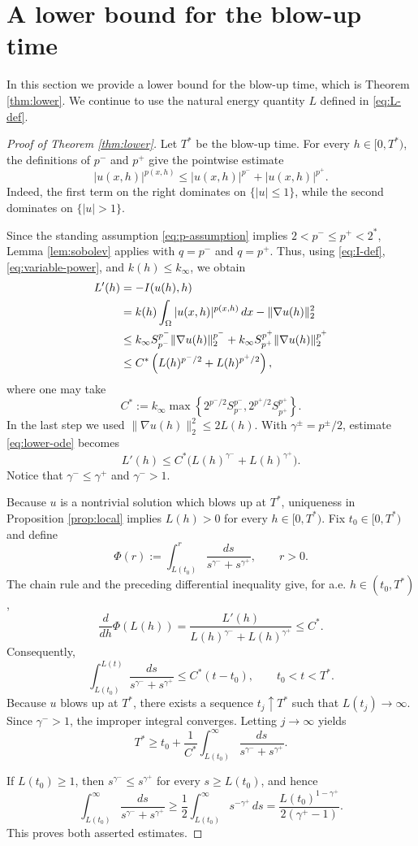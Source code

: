 \documentclass[12pt,reqno]{amsart}
\theoremstyle{definition}
\theoremstyle{remark}
\numberwithin{equation}{section}
\begin{document}
\section{A lower bound for the blow-up time} \label{sec:lower}


In this section we provide a lower bound for the blow-up time, which is Theorem \ref{thm:lower}.
We continue to use the natural energy quantity $L$ defined in \eqref{eq:L-def}.


\begin{proof}[Proof of Theorem \ref{thm:lower}]
Let $T^*$ be the blow-up time. For every $h\in[0,T^*)$, the definitions of $p^-$ and $p^+$ give the pointwise estimate
\begin{equation}\label{eq:variable-power}
|u(x,h)|^{p(x,h)}\le |u(x,h)|^{p^-}+|u(x,h)|^{p^+}.
\end{equation}
Indeed, the first term on the right dominates on $\{|u|\le1\}$, while the second dominates on $\{|u|>1\}$.

Since the standing assumption \eqref{eq:p-assumption} implies $2<p^-\le p^+<2^*$, Lemma \ref{lem:sobolev} applies with $q=p^-$ and $q=p^+$. Thus, using \eqref{eq:I-def}, \eqref{eq:variable-power}, and $k(h)\le k_\infty$, we obtain
\begin{align}
L'(h)
&=-I(u(h),h)\notag\\
&=k(h)\int_\Omega |u(x,h)|^{p(x,h)}\,dx
-\|\nabla u(h)\|_2^2\notag\\
&\le k_\infty S_{p^-}^{p^-}\|\nabla u(h)\|_2^{p^-}
+k_\infty S_{p^+}^{p^+}\|\nabla u(h)\|_2^{p^+}\notag\\
&\le C^*\left(L(h)^{p^-/2}+L(h)^{p^+/2}\right),
\label{eq:lower-ode}
\end{align}
where one may take
\[
C^*:=k_\infty\max\left\{
2^{p^-/2}S_{p^-}^{p^-},
2^{p^+/2}S_{p^+}^{p^+}
\right\}.
\]
In the last step we used $\|\nabla u(h)\|_2^2\le2L(h)$.
With $\gamma^\pm=p^\pm/2$, estimate \eqref{eq:lower-ode} becomes
\[
L'(h)\le C^*\bigl(L(h)^{\gamma^-}+L(h)^{\gamma^+}\bigr).
\]
Notice that $\gamma^-\le\gamma^+$ and $\gamma^->1$.

Because $u$ is a nontrivial solution which blows up at $T^*$, uniqueness in Proposition \ref{prop:local} implies $L(h)>0$ for every $h\in[0,T^*)$. Fix $t_0\in[0,T^*)$ and define
\[
\Phi(r):=\int_{L(t_0)}^r
\frac{ds}{s^{\gamma^-}+s^{\gamma^+}},
\qquad r>0.
\]
The chain rule and the preceding differential inequality give, for a.e. $h\in(t_0,T^*)$,
\[
\frac{d}{dh}\Phi(L(h))
=\frac{L'(h)}{L(h)^{\gamma^-}+L(h)^{\gamma^+}}
\le C^*.
\]
Consequently,
\[
\int_{L(t_0)}^{L(t)}
\frac{ds}{s^{\gamma^-}+s^{\gamma^+}}
\le C^*(t-t_0),
\qquad t_0<t<T^*.
\]
Because $u$ blows up at $T^*$, there exists a sequence $t_j\uparrow T^*$ such that $L(t_j)\to\infty$. Since $\gamma^->1$, the improper integral converges. Letting $j\to\infty$ yields
\[
T^*\ge t_0+\frac1{C^*}
\int_{L(t_0)}^\infty
\frac{ds}{s^{\gamma^-}+s^{\gamma^+}}.
\]

If $L(t_0)\ge1$, then $s^{\gamma^-}\le s^{\gamma^+}$ for every $s\ge L(t_0)$, and hence
\[
\int_{L(t_0)}^\infty
\frac{ds}{s^{\gamma^-}+s^{\gamma^+}}
\ge\frac12\int_{L(t_0)}^\infty s^{-\gamma^+}\,ds
=\frac{L(t_0)^{1-\gamma^+}}{2(\gamma^+-1)}.
\]
This proves both asserted estimates.
\end{proof}
\end{document}
